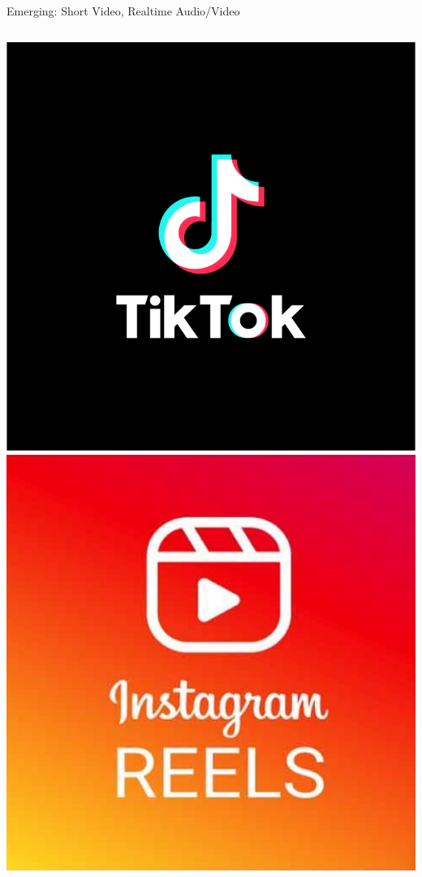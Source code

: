 \documentclass[nobackground,dvipsnames,table,aspectratio=169]{beamer}
\begin{document}
\begin{frame}{Emerging: Short Video, Realtime Audio/Video}
    \begin{columns}
            \includegraphics[width=\textwidth]{tiktok-logo}
            \includegraphics[width=\textwidth]{instagram-reels}

\end{columns}
\end{frame}
\end{document}
